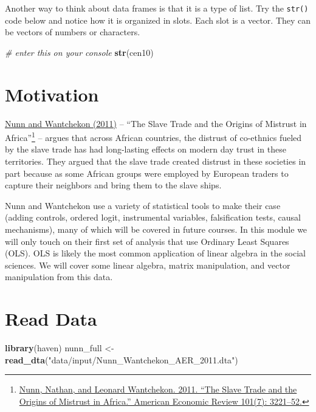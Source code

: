 \documentclass[]{book}
\newenvironment{Shaded}{\begin{snugshade}}{\end{snugshade}}
\newcommand{\CommentTok}[1]{\textcolor[rgb]{0.56,0.35,0.01}{\textit{#1}}}
\newcommand{\KeywordTok}[1]{\textcolor[rgb]{0.13,0.29,0.53}{\textbf{#1}}}
\newcommand{\NormalTok}[1]{#1}
\newcommand{\StringTok}[1]{\textcolor[rgb]{0.31,0.60,0.02}{#1}}
\let\rmarkdownfootnote\footnote%
\def\footnote{\protect\rmarkdownfootnote}
\theoremstyle{definition}
\theoremstyle{definition}
\theoremstyle{definition}
\theoremstyle{remark}
\begin{document}
Another way to think about data frames is that it is a type of list. Try the \texttt{str()} code below and notice how it is organized in slots. Each slot is a vector. They can be vectors of numbers or characters.

\begin{Shaded}
\begin{Highlighting}[]
\CommentTok{# enter this on your console}
\KeywordTok{str}\NormalTok{(cen10)}
\end{Highlighting}
\end{Shaded}

\hypertarget{motivation}{%
\section{Motivation}\label{motivation}}

\href{https://dash.harvard.edu/bitstream/handle/1/11986331/nunn-slave-trade.pdf}{Nunn and Wantchekon (2011)} -- ``The Slave Trade and the Origins of Mistrust in Africa''\footnote{\href{https://dash.harvard.edu/bitstream/handle/1/11986331/nunn-slave-trade.pdf}{Nunn, Nathan, and Leonard Wantchekon. 2011. ``The Slave Trade and the Origins of Mistrust in Africa.'' American Economic Review 101(7): 3221--52.}} -- argues that across African countries, the distrust of co-ethnics fueled by the slave trade has had long-lasting effects on modern day trust in these territories. They argued that the slave trade created distrust in these societies in part because as some African groups were employed by European traders to capture their neighbors and bring them to the slave ships.

Nunn and Wantchekon use a variety of statistical tools to make their case (adding controls, ordered logit, instrumental variables, falsification tests, causal mechanisms), many of which will be covered in future courses. In this module we will only touch on their first set of analysis that use Ordinary Least Squares (OLS). OLS is likely the most common application of linear algebra in the social sciences. We will cover some linear algebra, matrix manipulation, and vector manipulation from this data.

\hypertarget{read-data-1}{%
\section{Read Data}\label{read-data-1}}

\begin{Shaded}
\begin{Highlighting}[]
\KeywordTok{library}\NormalTok{(haven)}
\NormalTok{nunn_full <-}\StringTok{ }\KeywordTok{read_dta}\NormalTok{(}\StringTok{"data/input/Nunn_Wantchekon_AER_2011.dta"}\NormalTok{)}
\end{Highlighting}
\end{Shaded}
\end{document}
